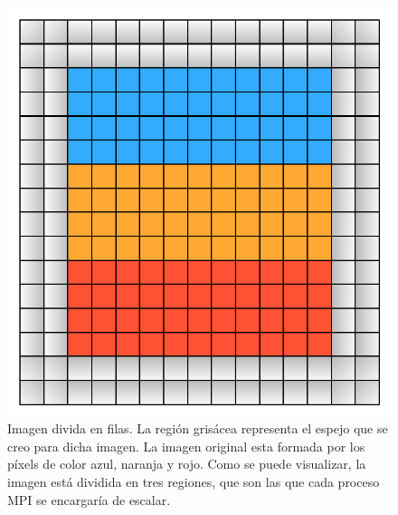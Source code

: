 \documentclass{article}
\begin{document}
\begin{figure}[h]
        \centering
        \includegraphics[angle=0, height=0.3\textheight]{img/repartoFilas.pdf}
        \caption{Imagen divida en filas. La región grisácea representa el espejo que se creo para dicha imagen. La imagen original esta formada por los píxels de color azul, naranja y rojo. Como se puede visualizar, la imagen está dividida en tres regiones, que son las que cada proceso MPI se encargaría de escalar.}
        \label{fig:repartoFilas}
\end{figure}
\end{document}
